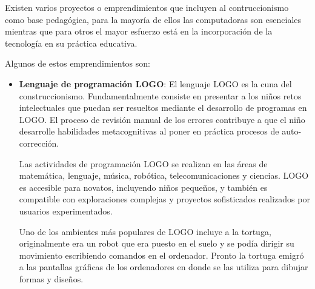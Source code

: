 Existen varios proyectos o emprendimientos que incluyen al contruccionismo como
base pedagógica, para la mayoría de ellos las computadoras son esenciales
mientras que para otros el mayor esfuerzo está en la incorporación de la
tecnología en su práctica educativa\cite{papertian:const}.

Algunos de estos emprendimientos son:

\begin{itemize}

\item \textbf{Lenguaje de programación LOGO}: El lenguaje LOGO es la cuna del construccionismo. %
	Fundamentalmente consiste en presentar a
	los niños retos intelectuales que puedan ser resueltos mediante el
	desarrollo de programas en LOGO. El proceso de revisión manual de los
	errores contribuye a que el niño desarrolle habilidades metacognitivas
	al poner en práctica procesos de auto-corrección\cite{logo:sg}.



    Las actividades de programación LOGO se realizan en las áreas de matemática, lenguaje, 
    música, robótica, telecomunicaciones y ciencias. LOGO es accesible para novatos, 
    incluyendo niños pequeños, y también es compatible con exploraciones complejas y 
    proyectos sofisticados realizados por usuarios experimentados\cite{logo:sg}.
    
    Uno de los ambientes más populares de LOGO incluye a la tortuga, originalmente 
    era un robot que era puesto en el suelo y se podía dirigir su movimiento 
    escribiendo comandos en el ordenador. Pronto la tortuga emigró a las 
    pantallas gráficas de los ordenadores en donde se las utiliza para dibujar 
    formas y diseños\cite{logo:sg}.


\end{itemize}
